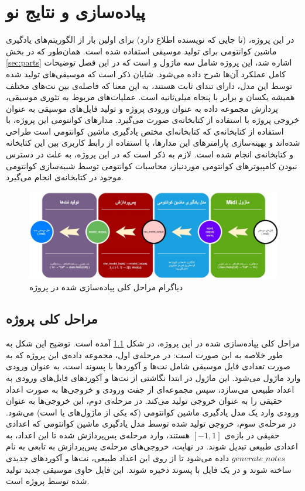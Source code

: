\chapter{پیاده‌سازی و نتایج نو}

در این پروژه، (تا جایی که نویسنده اطلاع دارد) برای اولین بار از الگوریتم‌های یادگیری ماشین کوانتومی برای تولید موسیقی استفاده شده است. همان‌طور که در بخش
\ref{sec:parts}
اشاره شد، این پروژه شامل سه ماژول 
و
است که در این فصل توضیحات کامل عملکرد آن‌ها شرح داده می‌شود.
شایان ذکر است که موسیقی‌های تولید شده توسط این مدل، دارای تندای ثابت هستند، به این معنا که فاصله‌ی بین نت‌های مختلف همیشه یکسان و برابر با پنجاه میلی‌ثانیه است.
عملیات‌های مربوط به تئوری موسیقی، پردازش مجموعه داده به عنوان ورودی پروژه و تولید فایل‌های موسیقی به عنوان خروجی پروژه با استفاده از کتابخانه‌ی
صورت می‌گیرد.
مدارهای کوانتومی این پروژه، با استفاده از کتابخانه‌ی 
که کتابخانه‌ای مختص یادگیری ماشین کوانتومی است طراحی شده‌اند و بهینه‌سازی پارامترهای این مدارها، با استفاده از رابط کاربری بین این کتابخانه و کتابخانه‌ی
انجام شده است.
لازم به ذکر است که در این پروژه، به علت در دسترس نبودن کامپیوترهای کوانتومی موردنیاز، محاسبات کوانتومی توسط شبیه‌سازی کوانتومی موجود در کتابخانه‌ی
انجام می‌گیرد.

\begin{figure}
	\centering
	\includegraphics[scale=0.355]{figures/Diagram.jpg}
	\caption{دیاگرام مراحل کلی پیاده‌سازی شده در پروژه}
	\label{fig:diagram}
\end{figure}

\section{مراحل کلی پروژه}
مراحل کلی پیاده‌سازی شده در این پروژه، در شکل
\ref{fig:diagram}
آمده است.
توضیح این شکل به طور خلاصه به این صورت است: در مرحله‌ی اول، مجموعه داده‌ی این پروژه که به صورت تعدادی فایل موسیقی شامل نت‌ها و آکوردها با پسوند
است، به عنوان ورودی وارد ماژول
می‌شود. این ماژول در ابتدا نگاشتی از نت‌ها و آکوردهای فایل‌های ورودی به اعداد طبیعی می‌سازد، سپس مجموعه‌ای از جفت ورودی و خروجی‌ها به صورت اعداد حقیقی را به عنوان خروجی تولید می‌کند. در مرحله‌ی دوم، این خروجی‌ها به عنوان ورودی وارد یک مدل یادگیری ماشین کوانتومی (که یکی از ماژول‌های 
یا
است) می‌شود. در مرحله‌ی سوم، خروجی تولید شده توسط مدل یادگیری ماشین کوانتومی که اعدادی حقیقی در بازه‌ی
$[-1, 1]$
هستند، وارد مرحله‌ی پس‌پردازش شده تا این اعداد، به اعدادی طبیعی تبدیل شوند.
در نهایت، خروجی‌های مرحله‌ی پس‌پردازش به تابعی به نام
$generate\_notes$
داده می‌شود تا از روی این اعداد طبیعی، نت‌ها و آکوردهای جدیدی ساخته شوند و در یک فایل با پسوند
ذخیره شوند. این فایل حاوی موسیقی جدید تولید شده توسط پروژه است.



